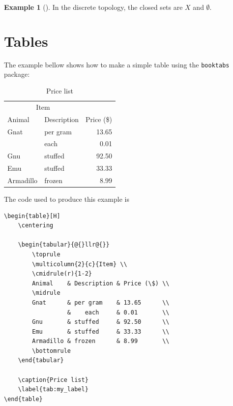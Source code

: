 \documentclass[letterpaper,11pt]{notes}
\theoremstyle{definition}
\newtheorem{Iexm}{Example}[section]
\theoremstyle{plain}
\newenvironment{exampleA}[2]
    {\begin{Iexm}[#1]\ifstrempty{#2}{}{\label{exmA:#2}}}
    {\end{Iexm}}
\theoremstyle{remark}
\begin{document}
\begin{exampleA}{}{}
In the discrete topology, the closed sets are $X$ and $\emptyset$.
\end{exampleA}

\section{Tables}

The example bellow shows how to make a simple table using the \texttt{booktabs} package:

\begin{table}[H]
    \centering

    \begin{tabular}{@{}llr@{}}  
        \toprule
        \multicolumn{2}{c}{Item} \\
        \cmidrule(r){1-2}
        Animal    & Description & Price (\$) \\
        \midrule
        Gnat      & per gram    & 13.65      \\
                  &    each     & 0.01       \\
        Gnu       & stuffed     & 92.50      \\
        Emu       & stuffed     & 33.33      \\
        Armadillo & frozen      & 8.99       \\
        \bottomrule
    \end{tabular}
    
    \caption{Price list}
    \label{tab:my_label}
\end{table}

The code used to produce this example is
\begin{verbatim}
\begin{table}[H]
    \centering

    \begin{tabular}{@{}llr@{}}  
        \toprule
        \multicolumn{2}{c}{Item} \\
        \cmidrule(r){1-2}
        Animal    & Description & Price (\$) \\
        \midrule
        Gnat      & per gram    & 13.65      \\
                  &    each     & 0.01       \\
        Gnu       & stuffed     & 92.50      \\
        Emu       & stuffed     & 33.33      \\
        Armadillo & frozen      & 8.99       \\
        \bottomrule
    \end{tabular}
    
    \caption{Price list}
    \label{tab:my_label}
\end{table}
\end{verbatim}
\end{document}
